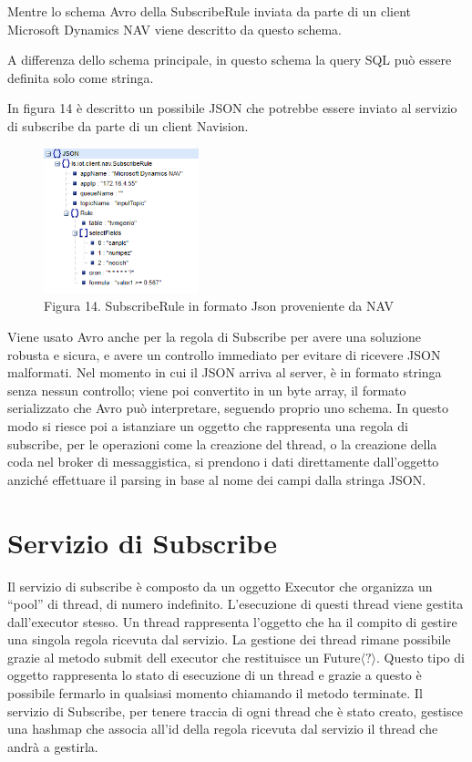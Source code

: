 Mentre lo schema Avro della SubscribeRule inviata da parte di un client Microsoft Dynamics NAV viene descritto da questo schema.
\begin{center}
		{\selectfont
			
		}
\end{center}
A differenza dello schema principale, in questo schema la query SQL può essere definita solo come stringa. 

In figura 14 è descritto un possibile JSON che potrebbe essere inviato al servizio di subscribe da parte di un client Navision.
\begin{figure}[h]
	\centering
	\includegraphics[width=0.4\textwidth]{subscribe-json-2.png}
	\caption*{Figura 14. SubscribeRule in formato Json proveniente da NAV}
\end{figure}

Viene usato Avro anche per la regola di Subscribe per avere una soluzione robusta e sicura, e avere un controllo immediato per evitare di ricevere JSON malformati. Nel momento in cui il JSON arriva al server, è in formato stringa senza nessun controllo; viene poi convertito in un byte array, il formato serializzato che Avro può interpretare, seguendo proprio uno schema. In questo modo si riesce poi a istanziare un oggetto che rappresenta una regola di subscribe, per le operazioni come la creazione del thread, o la creazione della coda nel broker di messaggistica, si prendono i dati direttamente dall'oggetto anziché effettuare il parsing in base al nome dei campi dalla stringa JSON.

\section{Servizio di Subscribe}
Il servizio di subscribe è composto da un oggetto Executor che organizza un “pool” di thread, di numero indefinito. L'esecuzione di questi thread viene gestita dall’executor stesso. Un thread rappresenta l’oggetto che ha il compito di gestire una singola regola ricevuta dal servizio. La gestione dei thread rimane possibile grazie al metodo submit dell executor che restituisce un Future$\langle?\rangle{}$. Questo tipo di oggetto rappresenta lo stato di esecuzione di un thread e grazie a questo è possibile fermarlo in qualsiasi momento chiamando il metodo terminate. Il servizio di Subscribe, per tenere traccia di ogni thread che è stato creato, gestisce una hashmap che associa all’id della regola ricevuta dal servizio il thread che andrà a gestirla. 

